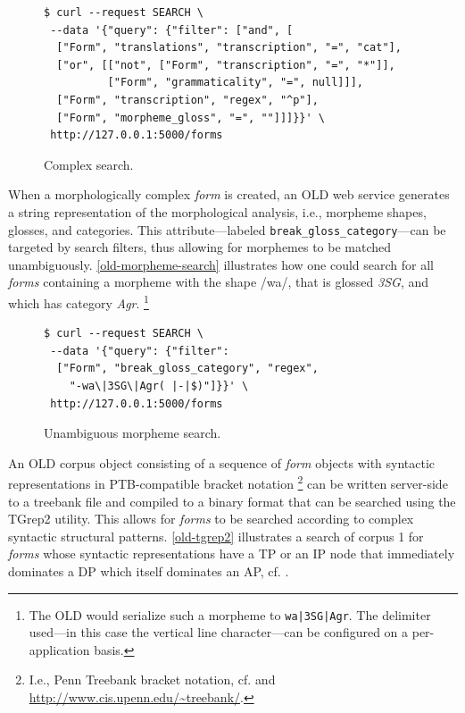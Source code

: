 \documentclass[11pt]{article}
\begin{document}
\begin{figure}[h]
\scriptsize
\begin{verbatim}
$ curl --request SEARCH \
 --data '{"query": {"filter": ["and", [
  ["Form", "translations", "transcription", "=", "cat"],
  ["or", [["not", ["Form", "transcription", "=", "*"]],
          ["Form", "grammaticality", "=", null]]],
  ["Form", "transcription", "regex", "^p"],
  ["Form", "morpheme_gloss", "=", ""]]]}}' \
 http://127.0.0.1:5000/forms
\end{verbatim}
\normalsize
\caption{Complex search.}
\label{old-search}
\end{figure}

When a morphologically complex \emph{form} is created, an OLD web service generates
a string representation of the morphological analysis, i.e., morpheme shapes,
glosses, and categories. This attribute---labeled
\texttt{break\_gloss\_category}---can be targeted by search filters, thus allowing
for morphemes to be matched unambiguously. \autoref{old-morpheme-search}
illustrates how one could search for all \emph{forms} containing a morpheme with the
shape /wa/, that is glossed \textit{3SG}, and which has category \textit{Agr}.%
\footnote{The OLD would serialize such a morpheme to \texttt{wa|3SG|Agr}. The
delimiter used---in this case the vertical line character---can be configured on
a per-application basis.}

\begin{figure}[h]
\scriptsize
\begin{verbatim}
$ curl --request SEARCH \
 --data '{"query": {"filter":
  ["Form", "break_gloss_category", "regex",
    "-wa\|3SG\|Agr( |-|$)"]}}' \
 http://127.0.0.1:5000/forms
\end{verbatim}
\normalsize
\caption{Unambiguous morpheme search.}
\label{old-morpheme-search}
\end{figure}

An OLD corpus object consisting of a sequence of \emph{form} objects with syntactic
representations in PTB-compatible bracket notation%
\footnote{I.e., Penn Treebank bracket notation, cf. \cite{taylor2003penn} and
\url{http://www.cis.upenn.edu/~treebank/}.} %
can be written server-side to a treebank file and compiled to a binary format
that can be searched using the TGrep2 utility. This allows for \emph{forms} to be
searched according to complex syntactic structural patterns. \autoref{old-tgrep2}
illustrates a search of corpus 1 for \emph{forms} whose syntactic
representations have a TP or an IP node that immediately dominates a DP which
itself dominates an AP, cf.  \cite{rohde2005tgrep2}.
\end{document}
